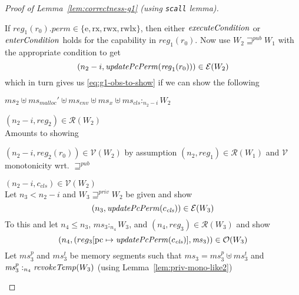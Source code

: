 \documentclass[a4paper]{article}
\newcommand{\update}[2]{[#1 \mapsto #2]}
\newcommand{\var}[1]{\mathit{#1}}
\newcommand{\hs}{\var{ms}}
\newcommand{\ms}{\hs}
\newcommand{\pcreg}{\mathrm{pc}}
\newcommand{\reg}{\var{reg}}
\newcommand{\heap}{\var{mem}}
\newcommand{\perm}{\var{perm}}
\newcommand{\env}{\var{env}}
\newcommand{\cls}{\var{cls}}
\newcommand{\plainfun}[2]{
  \ifthenelse{\equal{#2}{}}
  {\mathit{#1}}
  {\mathit{#1}(#2)}
}
\newcommand{\updatePcPerm}[1]{\plainfun{updatePcPerm}{#1}}
\newcommand{\execCond}[1]{\plainfun{executeCondition}{#1}}
\newcommand{\entryCond}[1]{\plainfun{enterCondition}{#1}}
\newcommand{\revokeTemp}[1]{\plainfun{revokeTemp}{#1}}
\newcommand{\futurewk}{\mathbin{\sqsupseteq}^{\var{pub}}}
\newcommand{\futurestr}{\mathbin{\sqsupseteq}^{\var{priv}}}
\newcommand{\heapSat}[3][\heap]{#1 :_{#2} #3}
\newcommand{\memSat}[3][n]{\heapSat[#2]{#1}{#3}}
\newcommand{\codelabel}[1]{\mathit{#1}}
\newcommand{\malloc}{\codelabel{malloc}}
\newcommand{\asmType}{\plaindom{AsmType}}
\newcommand{\plaindom}[1]{\mathrm{#1}}
\newcommand{\intr}[2]{\mathcal{#1}}
\newcommand{\valueintr}[1]{\intr{V}{#1}}
\newcommand{\exprintr}[1]{\intr{E}{#1}}
\newcommand{\regintr}[1]{\intr{R}{#1}}
\newcommand{\stdvr}{\valueintr{\asmType}}
\newcommand{\stder}{\exprintr{\asmType}}
\newcommand{\stdrr}{\regintr{\asmType}}
\newcommand{\observations}{\mathcal{O}}
\newcommand{\npair}[2][n]{\left(#1,#2 \right)}
\newcommand{\plainperm}[1]{\mathrm{#1}}
\newcommand{\exec}{\plainperm{rx}}
\newcommand{\entry}{\plainperm{e}}
\newcommand{\rwx}{\plainperm{rwx}}
\newcommand{\rwlx}{\plainperm{rwlx}}
\begin{document}
\begin{proof}[Proof of Lemma~\ref{lem:correctness-g1} (using \texttt{scall} lemma)]
\begin{enumproof}[resume]
\begin{enumproof}
          If $\reg_1(r_0).\perm \in \{\entry, \exec, \rwx, \rwlx\}$, then either $\execCond{}$ or $\entryCond{}$ holds for the capability in $\reg_1(r_0)$. Now use $W_2 \futurewk W_1$ with the appropriate condition to get 
          \[
            \npair[n_2-i]{\updatePcPerm{\reg_1(r_0)}} \in \stder(W_2)
          \]
          which in turn gives us \ref{eq:g1-obs-to-show} if we can show the following
          \begin{enumproof}
            \item $\memSat[n_2-i]{\ms_2 \uplus \ms_\malloc' \uplus \ms_\env \uplus \ms_x \uplus \ms_\cls}{W_2}$
            \item $\npair[n_2-i]{\reg_2} \in \stdrr(W_2)$ \\
              Amounts to showing
              \begin{enumproof}
                \item $\npair[n_2-i]{\reg_2(r_0)} \in \stdvr(W_2)$ by assumption $\npair[n_2]{\reg_1} \in \stdrr(W_1)$ and $\stdvr$ monotonicity wrt. $\futurewk$
                \item $\npair[n_2-i]{c_\cls} \in \stdvr(W_2)$ \\
                  Let $n_3 < n_2 - i$ and $W_3 \futurestr W_2$ be given and show
                  \[
                    \npair[n_3]{\updatePcPerm{c_\cls}} \in \stder(W_3)
                  \]
                  To this and let $n_4 \leq n_3$, $\memSat[n_4]{\ms_3}{W_3}$, and $\npair[n_4]{\reg_3} \in \stdrr(W_3)$ and show
                  \begin{equation}
                    \label{eq:g1-c-cls-obs}
                    \npair[n_4]{(reg_3\update{\pcreg}{\updatePcPerm{c_\cls}},\ms_3)} \in \observations(W_3)
                  \end{equation}
                  Let $\ms_3^p$ and $\ms_3^t$ be memory segments such that $\ms_3 = \ms_3^p \uplus \ms_3^t$ and $\memSat[n_4]{\ms_3^p}{\revokeTemp{W_3}}$ (using Lemma~\ref{lem:priv-mono-like2})


\end{enumproof}
\end{enumproof}
\end{enumproof}
\end{enumproof}
\end{proof}
\end{document}
